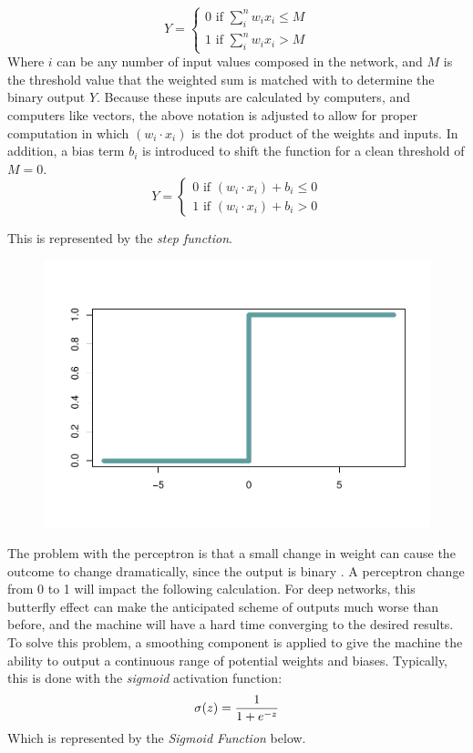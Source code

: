 \[
Y = 
\begin{cases}
0 \text{ if } \sum_i^n w_ix_i \le M \\
1 \text{ if } \sum_i^n w_ix_i > M
\end{cases}
\] Where \(i\) can be any number of input values composed in the
network, and \(M\) is the threshold value that the weighted sum is
matched with to determine the binary output \(Y\).  Because these inputs are calculated by computers, and computers like
vectors, the above notation is adjusted to allow for proper computation in which $(w_i \cdot x_i)$ is the dot product of the weights and inputs. In
addition, a bias term $b_i$ is introduced to shift the function for a clean threshold of \(M = 0\). \[
Y = 
\begin{cases}
0 \text{ if } (w_i \cdot x_i) + b_i \le 0 \\
1 \text{ if } (w_i \cdot x_i) + b_i > 0
\end{cases}
\]

This is represented by the \emph{step function}.

\begin{figure}[H]
    \centering
    \includegraphics[width = .7\textwidth]{Figures/step-function-1.pdf}
    \vspace{-40pt}
\end{figure}

The problem with the perceptron is that a small change in weight can
cause the outcome to change dramatically, since the output is binary \cite{nielsen}.  A perceptron change from 0 to 1 will impact the following calculation. For deep networks, this butterfly effect can make the anticipated scheme of outputs much worse than before, and the machine will have a hard time converging to the desired results.  To solve this problem, a smoothing component is applied to give the machine the ability to output a continuous range of potential weights and biases.  Typically, this is done with the \textit{sigmoid} activation function:
\[
\sigma(z) = \frac{1}{1+e^{-z}} \\
\]
Which is represented by the \emph{Sigmoid Function} below.

